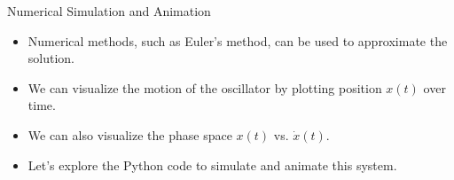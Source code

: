 \documentclass{beamer}
\begin{document}
\begin{frame}{Numerical Simulation and Animation}
    \begin{itemize}
        \item Numerical methods, such as Euler's method, can be used to approximate the solution.
        \item We can visualize the motion of the oscillator by plotting position $x(t)$ over time.
        \item We can also visualize the phase space $x(t)$ vs. $\dot{x}(t)$.
        \item Let's explore the Python code to simulate and animate this system.
    \end{itemize}
\end{frame}
\end{document}
